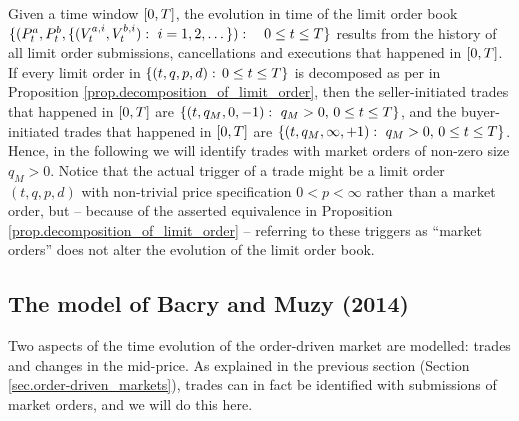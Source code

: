 \documentclass[10pt, article,table]{article}
\begin{document}
Given a time window $\timeWindow$, the evolution in time of the limit order book $\lbrace (\bestAskPrice_t, \bestBidPrice_t,\lbrace (\nthBestAskVolume[i]_t, \nthBestBidVolume[i]_t) : \, \, i=1,2,\dots\rbrace):  \quad 0\leq t \leq \timeHorizon \rbrace$ results from the history of all limit order submissions,  cancellations and executions that happened in $\timeWindow$. If every limit order in   $\lbrace (t,q,p,d): \, 0\leq t\leq \timeHorizon\rbrace$ is decomposed as per in Proposition \ref{prop.decomposition_of_limit_order}, then the seller-initiated trades that happened in $\timeWindow$ are $\lbrace (t,q_M,0,-1):\, \,  q_M>0, \, 0\leq t\leq \timeHorizon \rbrace$, and the buyer-initiated trades that happened in $\timeWindow$ are $\lbrace (t,q_M,\infty,+1):\, \,  q_M>0, \, 0\leq t\leq \timeHorizon \rbrace$.  Hence, in the following we will identify trades with market orders of non-zero size $q_M>0$. Notice that the actual trigger of a trade might be a limit order $(t,q,p,d)$ with non-trivial price specification $0<p<\infty$ rather than a market order, but -- because of the asserted equivalence in Proposition \ref{prop.decomposition_of_limit_order} -- referring to these triggers as ``market orders'' does not alter the evolution of the limit order book.  





\subsection{The model of Bacry and Muzy (2014)}\label{sec.BM14_model}
Two aspects of the time evolution of the order-driven market are modelled: trades and changes in the mid-price. As explained in the previous section (Section \ref{sec.order-driven_markets}), trades can in fact be identified with submissions of market orders, and we will do this here.
\end{document}
